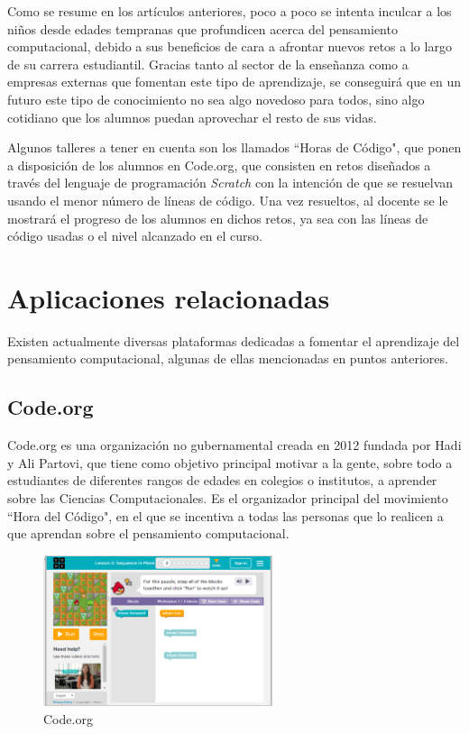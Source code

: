 Como se resume en los artículos anteriores, poco a poco se intenta inculcar a los niños desde edades tempranas que profundicen acerca del pensamiento computacional, debido a sus beneficios de cara a afrontar nuevos retos a lo largo de su carrera estudiantil. 
Gracias tanto al sector de la enseñanza como a empresas externas que fomentan este tipo de aprendizaje, se conseguirá que en un futuro este tipo de conocimiento no sea algo novedoso para todos, sino algo cotidiano que los alumnos puedan aprovechar el resto de sus vidas.

Algunos talleres a tener en cuenta son los llamados ``Horas de Código", que ponen a disposición de los alumnos en Code.org, que consisten en retos diseñados a través del lenguaje de programación \textit{Scratch} con la intención de que se resuelvan usando el menor número de líneas de código.
Una vez resueltos, al docente se le mostrará el progreso de los alumnos en dichos retos, ya sea con las líneas de código usadas o el nivel alcanzado en el curso.


\section{Aplicaciones relacionadas}
\label{2:sec:2}

Existen actualmente diversas plataformas dedicadas a fomentar el aprendizaje del pensamiento computacional, algunas de ellas mencionadas en puntos anteriores.


\subsection{Code.org}
\label{2:sec:1}

Code.org es una organización no gubernamental creada en 2012 fundada por Hadi y Ali Partovi, que tiene como objetivo principal motivar a la gente, sobre todo a estudiantes de diferentes rangos de edades en colegios o institutos, a aprender sobre las Ciencias Computacionales. Es el organizador principal del movimiento ``Hora del Código", en el que se incentiva a todas las personas que lo realicen a que aprendan sobre el
pensamiento computacional.

\begin{figure}[!th]
\begin{center}
\includegraphics[width=0.6\textwidth]{images/captura_code.eps}
\caption{Code.org}
\label{fig:1}
\end{center}
\end{figure}

